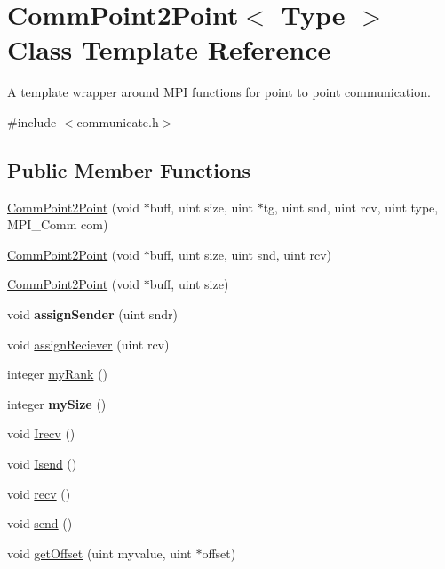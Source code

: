 \hypertarget{classCommPoint2Point}{}\section{Comm\+Point2\+Point$<$ Type $>$ Class Template Reference}
\label{classCommPoint2Point}


A template wrapper around M\+PI functions for point to point communication.  




{\ttfamily \#include $<$communicate.\+h$>$}

\subsection*{Public Member Functions}
\begin{DoxyCompactItemize}
\item 
\mbox{\hyperlink{classCommPoint2Point_aa23f80d9c92ccc7d1ce601ec829c6ff7}{Comm\+Point2\+Point}} (void $\ast$buff, uint size, uint $\ast$tg, uint snd, uint rcv, uint type, M\+P\+I\+\_\+\+Comm com)
\item 
\mbox{\hyperlink{classCommPoint2Point_a2d595c46eb1c130069ad90c9782cf63e}{Comm\+Point2\+Point}} (void $\ast$buff, uint size, uint snd, uint rcv)
\item 
\mbox{\hyperlink{classCommPoint2Point_a7e60b9a67fcae40edaa4410425fac6ab}{Comm\+Point2\+Point}} (void $\ast$buff, uint size)
\item 
\mbox{\label{classCommPoint2Point_a26bf177b75a31154c5d008b0ac7364f0}} 
void {\bfseries assign\+Sender} (uint sndr)
\item 
void \mbox{\hyperlink{classCommPoint2Point_a0b5ed7ad903ab51aa0429e54bcf6d58e}{assign\+Reciever}} (uint rcv)
\item 
integer \mbox{\hyperlink{classCommPoint2Point_aea7be5ce3b1dcd98c6d02c165be9867c}{my\+Rank}} ()
\item 
\mbox{\label{classCommPoint2Point_a7b2195c888a452f25f1567fa1006459e}} 
integer {\bfseries my\+Size} ()
\item 
void \mbox{\hyperlink{classCommPoint2Point_a91a4f9779a315269bd95543254bfe0ff}{Irecv}} ()
\item 
void \mbox{\hyperlink{classCommPoint2Point_a6415fa1d951388ab158d441539337ed0}{Isend}} ()
\item 
void \mbox{\hyperlink{classCommPoint2Point_a98dd7b3bbe9cb5b603d9bb29371eb7db}{recv}} ()
\item 
void \mbox{\hyperlink{classCommPoint2Point_a974ce073715ec520a0c56f003cb8a1b0}{send}} ()
\item 
void \mbox{\hyperlink{classCommPoint2Point_a9093c564a679e5df134859ed3841a84c}{get\+Offset}} (uint myvalue, uint $\ast$offset)
\end{DoxyCompactItemize}


